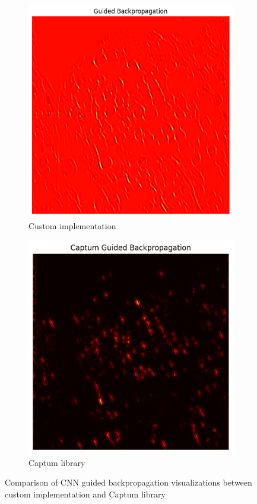 \documentclass[10pt,twocolumn]{article}
\begin{document}
\begin{figure}[h]
\begin{subfigure}{0.32\columnwidth}
\includegraphics[width=\linewidth]{imgs/cnn_gbp.png}
\caption{Custom implementation}
\end{subfigure}
\hfill
\begin{subfigure}{0.32\columnwidth}
\includegraphics[width=\linewidth]{imgs/cnn_gbp_captum.png}
\caption{Captum library}
\end{subfigure}
\caption{Comparison of CNN guided backpropagation visualizations between custom implementation and Captum library}
\label{fig:gbp_comparison_cnn}
\end{figure}
\end{document}
